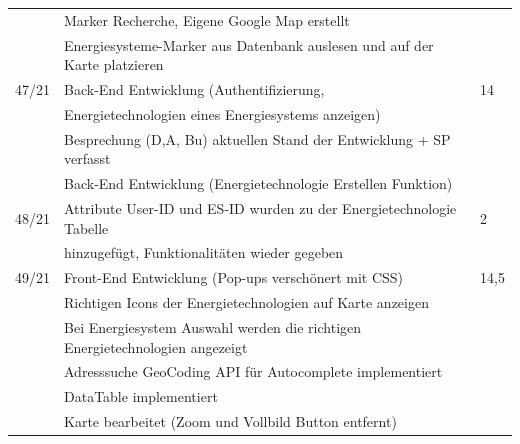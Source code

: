 \begin{table}[h]
\begin{tabular}{|l|l|l|}
		& Marker Recherche, Eigene Google Map erstellt & \\ 
		& Energiesysteme-Marker aus Datenbank auslesen und auf der Karte platzieren & \\ \hline	
47/21   & Back-End Entwicklung (Authentifizierung,  & 14 \\
		& Energietechnologien eines Energiesystems anzeigen)  &  \\ 
		& Besprechung (D,A, Bu) aktuellen Stand der Entwicklung + SP verfasst & \\ 
		& Back-End Entwicklung (Energietechnologie Erstellen Funktion) & \\ \hline		
48/21   & Attribute User-ID und ES-ID wurden zu der Energietechnologie Tabelle & 2 \\
		& hinzugefügt, Funktionalitäten wieder gegeben  &  \\ \hline			
49/21   & Front-End Entwicklung (Pop-ups verschönert mit CSS) & 14,5 \\
		& Richtigen Icons der Energietechnologien auf Karte anzeigen  &  \\ 
		& Bei Energiesystem Auswahl werden die richtigen Energietechnologien angezeigt & \\ 
		& Adresssuche GeoCoding API für Autocomplete implementiert & \\ 	
		& DataTable implementiert  & \\ 
		& Karte bearbeitet (Zoom und Vollbild Button entfernt) & \\ \hline			
	\end{tabular}
\end{table}

